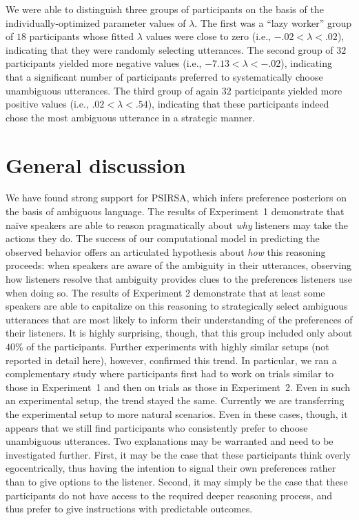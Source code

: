\documentclass[10pt,a4paper]{article}
\newcommand{\gcs}[1]{\textcolor{blue}{[gcs: #1]}}
\begin{document}
We were able to distinguish three groups of participants on the basis of the individually-optimized parameter values of $\lambda$. 
The first was a ``lazy worker'' group of $18$ participants whose fitted $\lambda$ values were close to zero (i.e.,  $-.02 < \lambda<.02$), indicating that they were randomly selecting utterances.
The second group of $32$ participants yielded more negative values (i.e., $-7.13<\lambda<-.02$), indicating that a significant number of participants preferred to systematically choose unambiguous utterances. 
The third group of again $32$ participants yielded more positive values (i.e., $.02<\lambda<.54$), indicating that these participants indeed chose the most ambiguous utterance in a strategic manner. 



\section{General discussion}

We have found strong support for PSIRSA, which infers preference posteriors on the basis of ambiguous language.
The results of Experiment~1 demonstrate that na\"ive speakers are able to reason pragmatically about \emph{why} listeners may take the actions they do. 
The success of our computational model in predicting the observed behavior offers an articulated hypothesis about \emph{how} this reasoning proceeds: when speakers are aware of the ambiguity in their utterances, observing how listeners resolve that ambiguity provides clues to the preferences listeners use when doing so.
The results of Experiment 2 demonstrate that at least some speakers are able to capitalize on this reasoning to strategically select ambiguous utterances that are most likely to inform their understanding of the preferences of their listeners.
It is highly surprising, though, that this group included only about $40\%$ of the participants. 
Further experiments with highly similar setups (not reported in detail here), however, confirmed this trend. 
In particular, we ran a complementary study where participants first had to work on trials similar to those in Experiment~1 and then on trials as those in Experiment~2. 
Even in such an experimental setup, the trend stayed the same.
Currently we are transferring the experimental setup to more natural scenarios. 
Even in these cases, though, it appears that we still find participants who consistently prefer to choose unambiguous utterances. 
Two explanations may be warranted and need to be investigated further. 
First, it may be the case that these participants think overly egocentrically, thus having the intention to signal their own preferences rather than to give options to the listener. 
Second, it may simply be the case that these participants do not have access to the required deeper reasoning process, and thus prefer to give instructions with predictable outcomes. 
\end{document}
